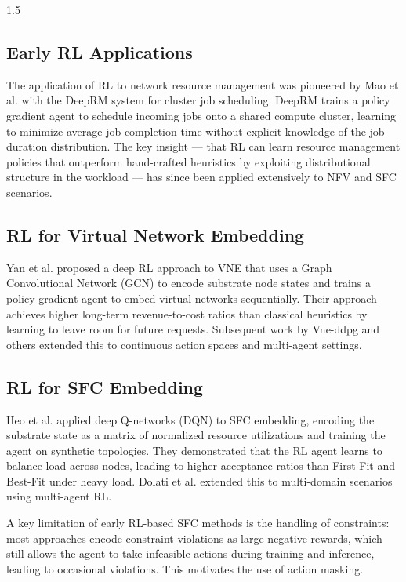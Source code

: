 \documentclass[A4paper,12pt]{report}
\theoremstyle{plain}
\theoremstyle{definition}
\theoremstyle{remark}
\numberwithin{equation}{section}
\begin{document}
\begin{spacing}{1.5}
\subsection{Early RL Applications}

The application of RL to network resource management was pioneered by Mao et al. \cite{mao2016} with the DeepRM system for cluster job scheduling. DeepRM trains a policy gradient agent to schedule incoming jobs onto a shared compute cluster, learning to minimize average job completion time without explicit knowledge of the job duration distribution. The key insight — that RL can learn resource management policies that outperform hand-crafted heuristics by exploiting distributional structure in the workload — has since been applied extensively to NFV and SFC scenarios.

\subsection{RL for Virtual Network Embedding}

Yan et al. \cite{yan2020} proposed a deep RL approach to VNE that uses a Graph Convolutional Network (GCN) to encode substrate node states and trains a policy gradient agent to embed virtual networks sequentially. Their approach achieves higher long-term revenue-to-cost ratios than classical heuristics by learning to leave room for future requests. Subsequent work by Vne-ddpg \cite{zhu2021} and others extended this to continuous action spaces and multi-agent settings.

\subsection{RL for SFC Embedding}

Heo et al. \cite{heo2020} applied deep Q-networks (DQN) to SFC embedding, encoding the substrate state as a matrix of normalized resource utilizations and training the agent on synthetic topologies. They demonstrated that the RL agent learns to balance load across nodes, leading to higher acceptance ratios than First-Fit and Best-Fit under heavy load. Dolati et al. \cite{dolati2021} extended this to multi-domain scenarios using multi-agent RL.

A key limitation of early RL-based SFC methods is the handling of constraints: most approaches encode constraint violations as large negative rewards, which still allows the agent to take infeasible actions during training and inference, leading to occasional violations. This motivates the use of action masking.


\end{spacing}
\end{document}
